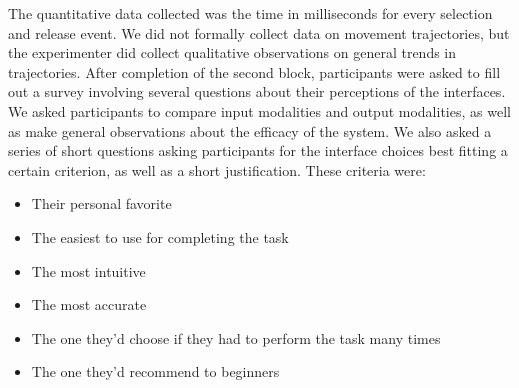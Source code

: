 \documentclass[pageno]{jpaper}
\begin{document}
The quantitative data collected was the time in milliseconds for every selection and release event. We did not formally
collect data on movement trajectories, but the experimenter did collect qualitative observations on general trends in
trajectories. After completion of the second block, participants were asked to fill out a survey involving several questions
about their perceptions of the interfaces. We asked participants to compare input modalities and output modalities, as well as
make general observations about the efficacy of the system. We also asked a series of short questions asking participants for
the interface choices best fitting a certain criterion, as well as a short justification. These criteria were:
\begin{itemize}
\item Their personal favorite
\item The easiest to use for completing the task
\item The most intuitive
\item The most accurate
\item The one they'd choose if they had to perform the task many times
\item The one they'd recommend to beginners
\end{itemize}
\end{document}
